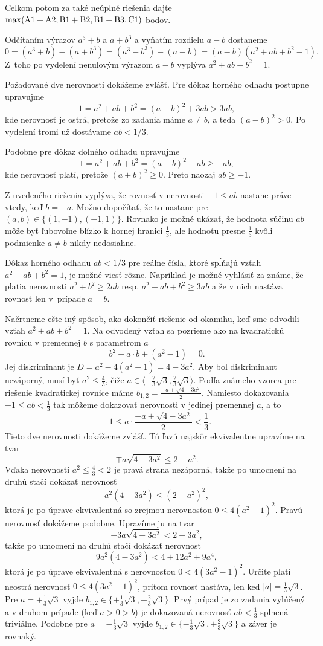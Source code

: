 {\smallskip\noindent
Celkom potom za také neúplné riešenia dajte $\rm \max(A1+A2,B1+B2,B1+B3,C1)$ bodov.
\endschema
}

{%
Odčítaním výrazov $a^3 + b$ a $a + b^3$ a vyňatím rozdielu $a-b$ dostaneme
$$
0 = (a^3+b)-(a+b^3) = (a^3-b^3) - (a-b) = (a-b)(a^2 + ab + b^2 - 1).
$$
Z~toho po vydelení nenulovým výrazom $a-b$ vyplýva $a^2 + ab + b^2= 1$.

Požadované dve nerovnosti dokážeme zvlášť. Pre dôkaz horného odhadu postupne upravujme
$$ 1 = a^2+ab+b^2 = (a-b)^2 + 3ab > 3ab,
$$
kde nerovnosť je ostrá, pretože zo zadania máme $a\ne b$, a teda $(a-b)^2>0$. Po vydelení tromi už dostávame $ab<1/3$.

Podobne pre dôkaz dolného odhadu upravujme
$$ 1 = a^2+ab+b^2 = (a+b)^2 - ab \ge -ab,
$$
kde nerovnosť platí, pretože $(a+b)^2\ge 0$.
Preto naozaj $ab\ge-1$.

\poznamka
Z uvedeného riešenia vyplýva, že rovnosť v nerovnosti ${-1}\le ab$ nastane práve vtedy, keď $b={-a}$.
Možno dopočítať, že to nastane pre $(a,b)\in\{(1,{-1}),({-1},1)\}$.
Rovnako je možné ukázať, že hodnota súčinu $ab$ môže byť ľubovoľne blízko k hornej hranici $\frac{1}{3}$, ale hodnotu presne $\frac{1}{3}$ kvôli podmienke $a\ne b$ nikdy nedosiahne.


\poznamka
Dôkaz horného odhadu $ab<1/3$ pre reálne čísla, ktoré spĺňajú vzťah $a^2+ab+b^2=1$, je možné viesť rôzne. Napríklad je možné vyhlásiť za známe, že platia nerovnosti $a^2+b^2\ge 2ab$ resp. $a^2+ab+b^2\ge 3ab$ a že v nich nastáva rovnosť len v~prípade $a=b$.


\ineriesenie
Načrtneme ešte iný spôsob, ako dokončiť riešenie od okamihu, keď sme odvodili vzťah $a^2 + ab + b^2= 1$.
Na odvodený vzťah sa pozrieme ako na kvadratickú rovnicu v premennej $b$ s parametrom $a$
$$
b^2 + a\cdot b + (a^2-1)=0.
$$
Jej diskriminant je $D=a^2-4(a^2-1)= 4-3a^2$.
Aby bol diskriminant nezáporný, musí byť $a^2\le\frac43$, čiže $a\in\langle -\frac23\sqrt 3,\frac23\sqrt3\rangle$. Podľa známeho vzorca pre riešenie kvadratickej rovnice máme $b_{1,2}=\frac{-a\pm\sqrt{4-3a^2}}{2}$. Namiesto dokazovania ${-1}\le ab<\frac13$ tak môžeme dokazovať nerovnosti v jedinej premennej $a$, a to
$$
-1 \le a\cdot \frac{-a\pm\sqrt{4-3a^2}}{2} < \frac13.
$$
Tieto dve nerovnosti dokážeme zvlášť. Tú ľavú najskôr ekvivalentne upravíme na tvar
$$
\mp a\sqrt{4-3a^2}\le 2-a^2.
$$
Vďaka nerovnosti $a^2\leq\frac43<2$ je pravá strana nezáporná, takže po umocnení na druhú stačí dokázať nerovnosť
$$ a^2(4-3a^2) \le (2-a^2)^2,
$$
ktorá je po úprave ekvivalentná so zrejmou nerovnosťou $0\le 4(a^2-1)^2$.
Pravú nerovnosť dokážeme podobne. Upravíme ju na tvar
$$\pm3a\sqrt{4-3a^2}< 2+3a^2,
$$
takže po umocnení na druhú stačí dokázať nerovnosť
$$ 9a^2(4-3a^2)< 4+12a^2+9a^4,
$$
ktorá je po úprave ekvivalentná s nerovnosťou $0< 4(3a^2-1)^2$.
Určite platí neostrá nerovnosť $0\le 4(3a^2-1)^2$, pritom rovnosť nastáva, len keď $|a|=\frac13\sqrt3$. Pre
$a={+\frac13\sqrt 3}$ vyjde $b_{1,2}\in\{{+\frac13\sqrt 3}, {-\frac23\sqrt3}\}$. Prvý prípad je zo zadania vylúčený a
v druhom prípade (keď $a>0>b$) je dokazovaná nerovnosť $ab<\frac13$ splnená triviálne. Podobne pre $a={-\frac13\sqrt 3}$ vyjde $b_{1,2}\in\{{-\frac13\sqrt 3}, {+\frac23\sqrt3}\}$ a záver je rovnaký.

}
